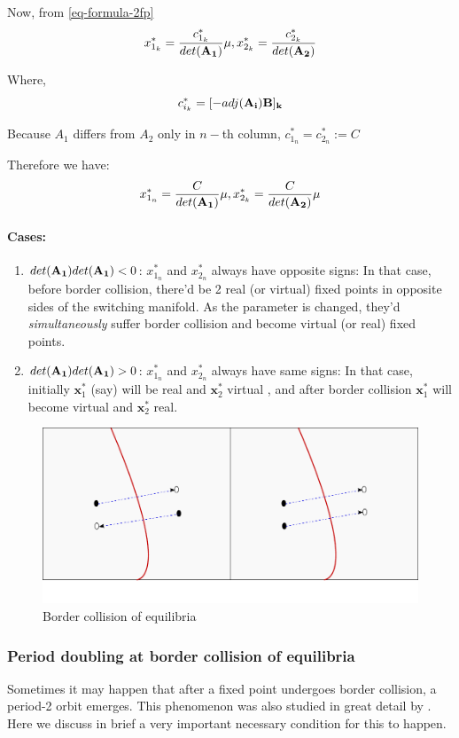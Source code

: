 \documentclass{book}
\renewcommand{\(}{\begin{columns}}
\renewcommand{\)}{\end{columns}}
\newcommand{\<}[1]{\begin{column}{#1}}
\renewcommand{\>}{\end{column}}
\newcommand{\mb}[1]{\mathbf{#1}}
\newcommand{\para}{\paragraph}
\begin{document}
Now, from \eqref{eq-formula-2fp}
\begin{equation}
\label{eq-formula2-2fp}
x^*_{1_k}=\frac{c^*_{1_k}}{det(\bf{A_1})}\mu, x^*_{2_k}=\frac{c^*_{2_k}}{det(\bf{A_2})}
\end{equation}

Where, \[
c^*_{i_k}=[-adj(\bf{A_i)B}]_k
\]

Because $A_1$ differs from $A_2$ only in $n-$th column, $c^*_{1_n}=c^*_{2_n}:=C$

Therefore we have:
\begin{equation}
\label{eq-final-form-2fps}
x^*_{1_n}=\frac{C}{det(\bf{A_1})}\mu, x^*_{2_k}=\frac{C}{det(\bf{A_2})}\mu
\end{equation}

\para{Cases:\\}
\begin{enumerate}
\item $det({\bf A_1})det({\bf A_1})<0$:  $x^*_{1_n}$ and $x^*_{2_n}$ always have 
opposite signs:  In that case, before border collision, there'd be 2 real (or virtual)
fixed points in opposite sides of the switching manifold. As the parameter is 
changed, they'd \emph{simultaneously} suffer border collision and become 
virtual (or real) fixed points.
\item $det({\bf A_1})det({\bf A_1})>0$:  $x^*_{1_n}$ and $x^*_{2_n}$ always have 
same signs: In that case, initially $\mb{x}_1^*$ (say) will be real and $\mb{x}_2^*$ 
virtual , and after border collision $\mb{x}_1^*$ will become virtual and $\mb{x}_2^*$ 
real.   
\end{enumerate}

\begin{figure}
\caption{Border collision of equilibria}
\begin{center}
\includegraphics[width=0.9\columnwidth]{cases}
\end{center}
\end{figure}

\subsubsection{Period doubling at border collision of equilibria}
Sometimes it may happen that after a fixed point undergoes border collision, a 
period-2 orbit emerges.  This phenomenon was also studied in great detail by \cite{feigin-1999}.
Here we discuss in brief a very important necessary condition for this to 
happen.  
\end{document}

